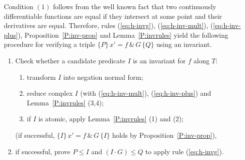 \documentclass[envcountsame,envcountsect]{llncs}
\begin{document}
Condition $(1)$ follows from the well known fact that two continuously
differentiable functions are equal if they intersect at some point and their
derivatives are equal. Therefore, rules (\ref{eq:h-invg}), (\ref{eq:h-inv-mult}), (\ref{eq:h-inv-plus}),
Proposition~\ref{P:inv-prop} and Lemma~\ref{P:invrules} yield the following procedure for verifying a triple $\{P\}\, x' = f\, \&\, G\, \{Q\}$
using an invariant.
\begin{enumerate}
\item Check whether a candidate predicate $I$ is an invariant for $f$
  along $T$:
	\begin{enumerate}
	\item transform $I$ into negation normal form;
	\item reduce complex $I$ (with (\ref{eq:h-inv-mult}), (\ref{eq:h-inv-plus}) and Lemma~\ref{P:invrules} (3,4);
	\item if $I$ is atomic, apply Lemma~\ref{P:invrules} (1) and (2);
	\end{enumerate}
(if successful,  $\{I\}\, x' = f\, \&\, G\, \{I\}$ holds by Proposition~\ref{P:inv-prop}),
\item if successful, prove $P\le I$ and $(I\cdot G)\le Q$ to apply rule (\ref{eq:h-invg}).
\end{enumerate}
\end{document}
